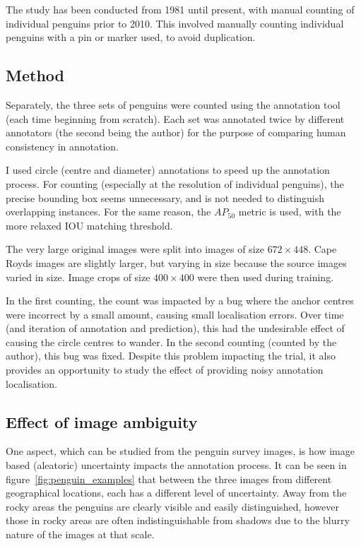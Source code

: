 The study has been conducted from 1981 until present, with manual counting of individual penguins prior to 2010. This involved manually counting individual penguins with a pin or marker used, to avoid duplication. 


\subsection {Method}

Separately, the three sets of penguins were counted using the annotation tool (each time beginning from scratch). Each set was annotated twice by different annotators (the second being the author) for the purpose  of comparing human consistency in annotation.

I used circle (centre and diameter) annotations to speed up the annotation process. For counting (especially at the resolution of individual penguins), the precise bounding box seems unnecessary, and is not needed to distinguish overlapping instances. For the same reason, the $AP_{50}$ metric is used, with the more relaxed \gls{IOU} matching threshold.

The very large original images were split into images of size $ 672\times448 $. Cape Royds images are slightly larger, but varying in size because the source images varied in size. Image crops of size $ 400\times400 $ were then used during training.

In the first counting, the count was impacted by a bug where the anchor centres were incorrect by a small amount, causing small localisation errors. Over time (and iteration of annotation and prediction), this had the undesirable effect of causing the circle centres to wander. In the second counting (counted by the author), this bug was fixed. Despite this problem impacting the trial, it also provides an opportunity to study the effect of providing noisy annotation localisation.

\subsection {Effect of image ambiguity}

One aspect, which can be studied from the penguin survey images, is how image based (aleatoric) uncertainty impacts the annotation process. It can be seen in figure~\ref{fig:penguin_examples} that between the three images from different geographical locations, each has a different level of uncertainty. Away from the rocky areas the penguins are clearly visible and easily distinguished, however those in rocky areas are often indistinguishable from shadows due to the blurry nature of the images at that scale.

